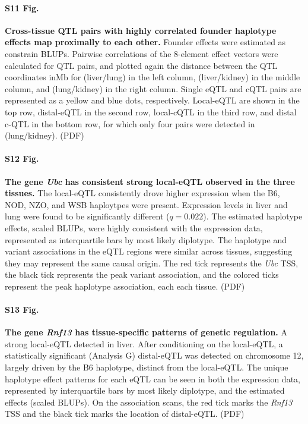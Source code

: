 \documentclass[10pt,letterpaper]{article}
\begin{document}
\paragraph*{S11 Fig.}
\label{S_qtl_cor_by_distance_comparison}
{\bf Cross-tissue QTL pairs with highly correlated founder haplotype effects map proximally to each other.}
Founder effects were estimated as constrain BLUPs. Pairwise correlations of the 8-element effect vectors were calculated for QTL pairs, and plotted again the distance between the QTL coordinates inMb for (liver/lung) in the left column, (liver/kidney) in the middle column, and (lung/kidney) in the right column. Single eQTL and cQTL pairs are represented as a yellow and blue dots, respectively. Local-eQTL are shown in the top row, distal-eQTL in the second row, local-cQTL in the third row, and distal c-QTL in the bottom row, for which only four pairs were detected in (lung/kidney). (PDF)

\paragraph*{S12 Fig.}
\label{S_ubc_correlated_eqtl}
{\bf The gene \textit{Ubc} has consistent strong local-eQTL observed in the three tissues.}
The local-eQTL consistently drove higher expression when the B6, NOD, NZO, and WSB haploytpes were present. Expression levels in liver and lung were found to be significantly different ($q = 0.022$). The estimated haplotype effects, scaled BLUPs, were highly consistent with the expression data, represented as interquartile bars by most likely diplotype. The haplotype and variant associations in the eQTL regions were similar across tissues, suggesting they may represent the same causal origin. The red tick represents the \textit{Ubc} TSS, the black tick represents the peak variant association, and the colored ticks represent the peak haplotype association, each each tissue. (PDF)

\paragraph*{S13 Fig.}
\label{S_rnf13_distal_eqtl}
{\bf The gene \textit{Rnf13} has tissue-specific patterns of genetic regulation.}
A strong local-eQTL detected in liver. After conditioning on the local-eQTL, a statistically significant (Analysis G) distal-eQTL was detected on chromosome 12, largely driven by the B6 haplotype, distinct from the local-eQTL. The unique haplotype effect patterns for each eQTL can be seen in both the expression data, represented by interquartile bars by most likely diplotype, and the estimated effects (scaled BLUPs). On the association scans, the red tick marks the \textit{Rnf13} TSS and the black tick marks the location of distal-eQTL. (PDF)
\end{document}
